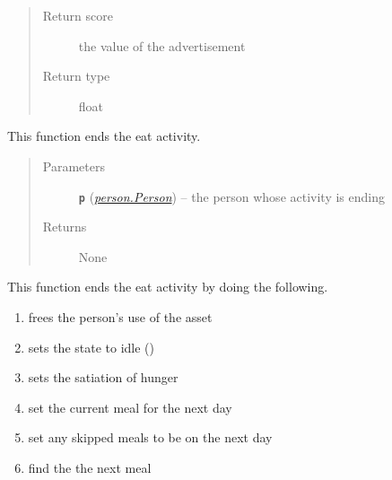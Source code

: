 \documentclass[letterpaper,10pt,english]{sphinxmanual}
\begin{document}
\begin{fulllineitems}
\begin{fulllineitems}
\begin{quote}
\begin{description}
\item[{Return score}] \leavevmode
the value of the advertisement

\item[{Return type}] \leavevmode
float

\end{description}\end{quote}

\end{fulllineitems}


\begin{fulllineitems}
\label{eat:eat.Eat.end}
This function ends the eat activity.
\begin{quote}\begin{description}
\item[{Parameters}] \leavevmode
\textbf{\texttt{p}} ({\hyperref[person:person.Person]{\emph{\emph{person.Person}}}}) -- the person whose activity is ending

\item[{Returns}] \leavevmode
None

\end{description}\end{quote}

\end{fulllineitems}


\begin{fulllineitems}
\label{eat:eat.Eat.end_meal}
This function ends the eat activity by doing the following.
\begin{enumerate}
\item {} 
frees the person's use of the asset

\item {} 
sets the state to idle ()

\item {} 
sets the satiation of hunger

\item {} 
set the current meal for the next day

\item {} 
set any skipped meals to be on the next day

\item {} 
find the the next meal


\end{enumerate}
\end{fulllineitems}
\end{fulllineitems}
\end{document}
